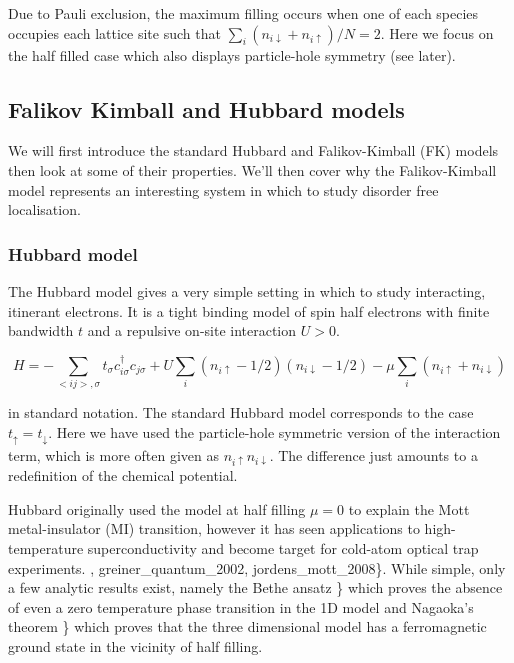 Due to Pauli exclusion, the maximum filling occurs when one of each
species occupies each lattice site such that
\(\sum_i (n_{i\downarrow} + n_{i\uparrow} )/ N = 2\). Here we focus on
the half filled case which also displays particle-hole symmetry (see
later).

\hypertarget{falikov-kimball-and-hubbard-models}{%
\subsection{Falikov Kimball and Hubbard
models}\label{falikov-kimball-and-hubbard-models}}

We will first introduce the standard Hubbard and Falikov-Kimball (FK)
models then look at some of their properties. We'll then cover why the
Falikov-Kimball model represents an interesting system in which to study
disorder free localisation.

\hypertarget{hubbard-model}{%
\subsubsection{Hubbard model}\label{hubbard-model}}

The Hubbard model gives a very simple setting in which to study
interacting, itinerant electrons. It is a tight binding model of spin
half electrons with finite bandwidth \(t\) and a repulsive on-site
interaction \(U > 0\).

\[
    H = -\sum_{<ij>,\sigma} t_{\sigma} c^\dagger_{i\sigma}c_{j\sigma} + U \sum_{i} (n_{i \uparrow} - 1/2)( n_{i\downarrow} - 1/2) - \mu \sum_i \left( n_{i \uparrow} + n_{i \downarrow} \right)
\]

in standard notation. The standard Hubbard model corresponds to the case
\(t_{\uparrow} = t_{\downarrow}\). Here we have used the particle-hole
symmetric version of the interaction term, which is more often given as
\(n_{i \uparrow} n_{i\downarrow}\). The difference just amounts to a
redefinition of the chemical potential.

Hubbard originally used the model at half filling \(\mu = 0\) to explain
the Mott metal-insulator (MI) transition, however it has seen
applications to high-temperature superconductivity and become target for
cold-atom optical trap experiments. \textcite{noauthor_hubbard_2013},
greiner\_quantum\_2002, jordens\_mott\_2008\}. While simple, only a few
analytic results exist, namely the Bethe ansatz
\textcite{lieb_absence_1968}\} which proves the absence of even a zero
temperature phase transition in the 1D model and Nagaoka's theorem
\textcite{nagaoka_ferromagnetism_1966}\} which proves that the three
dimensional model has a ferromagnetic ground state in the vicinity of
half filling.

